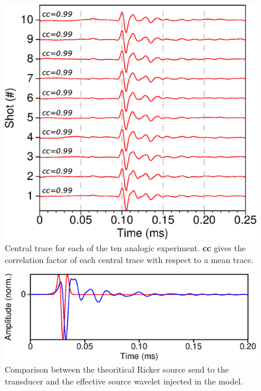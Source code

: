 \documentclass[manuscript,revised]{geophysics}
\begin{document}
\begin{figure}[!h]
	\centering
	\includegraphics[scale=0.5]{fig/musc_F50_CT.eps}
	\caption{Central trace for each of the ten analogic experiment. \textbf{cc} gives the correlation factor of each central trace with respect to a mean trace.}
	\label{panel_central_traces_cc}
\end{figure}

\begin{figure}[!h]
	\centering
	\includegraphics[scale=0.5]{fig/srccomp.eps}
	\caption{Comparison between the theoritical Ricker source send to the transducer and the effective source wavelet injected in the model.}
	\label{srccomp}
\end{figure}
\end{document}
